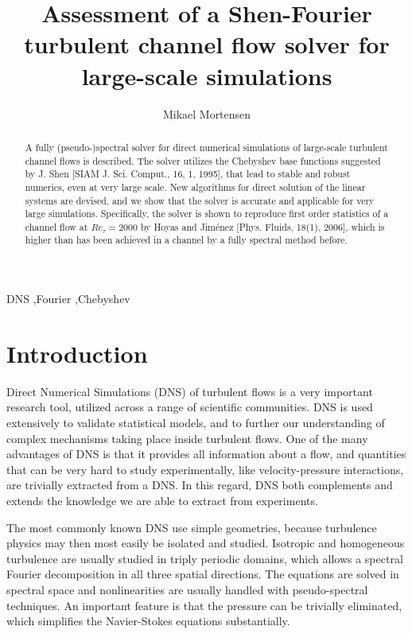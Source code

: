 \documentclass[preprint]{elsarticle}
\begin{document}
\begin{frontmatter}

\title{Assessment of a Shen-Fourier turbulent channel flow solver for large-scale simulations}
\author[mmo]{Mikael Mortensen}
\address[mmo]{Department of Mathematics, Division of Mechanics, University of Oslo}

\begin{abstract}
A fully (pseudo-)spectral solver for direct numerical simulations of large-scale turbulent channel flows is described. The solver utilizes the Chebyshev base functions suggested by J. Shen [SIAM J. Sci. Comput., 16, 1, 1995], that lead to stable and robust numerics, even at very large scale. New algorithms for direct solution of the linear systems are devised, and we show that the solver is accurate and applicable for very large simulations. Specifically, the solver is shown to reproduce first order statistics of a channel flow at $Re_{\tau}=2000$ by Hoyas and Jim\'{e}nez [Phys. Fluids, 18(1), 2006], which is higher than has been achieved in a channel by a fully spectral method before. 
\end{abstract}
\begin{keyword}
DNS \sep Fourier \sep Chebyshev
\end{keyword}

\end{frontmatter}
\section{Introduction}
Direct Numerical Simulations (DNS) of turbulent flows is a very important research tool, utilized across a range of scientific communities. DNS is used extensively to validate statistical models, and to further our understanding of complex mechanisms taking place inside turbulent flows. One of the many advantages of DNS is that it provides all information about a flow, and quantities that can be very hard to study experimentally, like velocity-pressure interactions, are trivially extracted from a DNS. In this regard, DNS both complements and extends the knowledge we are able to extract from experiments.

The most commonly known DNS use simple geometries, because turbulence physics may then most easily be isolated and studied. Isotropic and homogeneous turbulence are usually studied in triply periodic domains, which allows a spectral Fourier decomposition in all three spatial directions. The equations are solved in spectral space and nonlinearities are usually handled with pseudo-spectral techniques. An important feature is that the pressure can be trivially eliminated, which simplifies the Navier-Stokes equations substantially.
\end{document}
